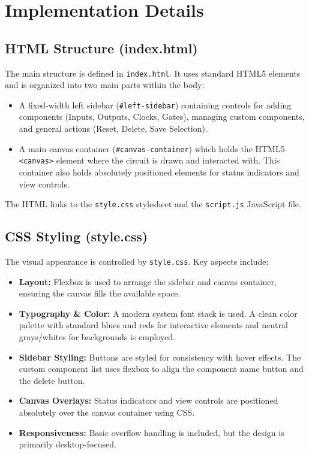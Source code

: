 \documentclass[11pt, a4paper]{article}
\begin{document}
\section{Implementation Details}

\subsection{HTML Structure (index.html)}
The main structure is defined in \texttt{index.html}. It uses standard HTML5 elements and is organized into two main parts within the body:
\begin{itemize}
    \item A fixed-width left sidebar (\texttt{#left-sidebar}) containing controls for adding components (Inputs, Outputs, Clocks, Gates), managing custom components, and general actions (Reset, Delete, Save Selection).
    \item A main canvas container (\texttt{#canvas-container}) which holds the HTML5 \texttt{<canvas>} element where the circuit is drawn and interacted with. This container also holds absolutely positioned elements for status indicators and view controls.
\end{itemize}
The HTML links to the \texttt{style.css} stylesheet and the \texttt{script.js} JavaScript file.

\subsection{CSS Styling (style.css)}
The visual appearance is controlled by \texttt{style.css}. Key aspects include:
\begin{itemize}
    \item \textbf{Layout:} Flexbox is used to arrange the sidebar and canvas container, ensuring the canvas fills the available space.
    \item \textbf{Typography \& Color:} A modern system font stack is used. A clean color palette with standard blues and reds for interactive elements and neutral grays/whites for backgrounds is employed.
    \item \textbf{Sidebar Styling:} Buttons are styled for consistency with hover effects. The custom component list uses flexbox to align the component name button and the delete button.
    \item \textbf{Canvas Overlays:} Status indicators and view controls are positioned absolutely over the canvas container using CSS.
    \item \textbf{Responsiveness:} Basic overflow handling is included, but the design is primarily desktop-focused.
\end{itemize}
\end{document}
